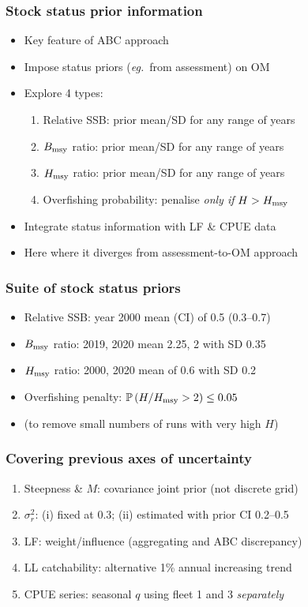 \documentclass{beamer}
\newcommand{\sigr}{\sigma^2_r}
\newcommand{\bmsy}{B_{\rm msy}}
\newcommand{\hmsy}{H_{\rm msy}}
\newcommand{\eg}{\textit{eg.}~}
\begin{document}
\begin{frame}
\frametitle{Stock status prior information}
\begin{itemize}
    \item Key feature of ABC approach
    \item Impose status priors (\eg from assessment) on OM
    \item Explore 4 types:
        \vspace{0.25cm}
        \begin{enumerate}
            \item Relative SSB: prior mean/SD for any range of years
            \item $\bmsy$ ratio: prior mean/SD for any range of years
            \item $\hmsy$ ratio: prior mean/SD for any range of years
            \item Overfishing probability: penalise \emph{only if} $H>\hmsy$
        \end{enumerate}
        \vspace{0.25cm}
    \item Integrate status information with LF \& CPUE data
    \item Here where it diverges from assessment-to-OM approach
\end{itemize}
\end{frame}
\begin{frame}
\frametitle{Suite of stock status priors}
\begin{itemize}
    \item Relative SSB: year 2000 mean (CI) of 0.5 (0.3--0.7)
    \item $\bmsy$ ratio: 2019, 2020 mean 2.25, 2 with SD 0.35
    \item $\hmsy$ ratio: 2000, 2020 mean of 0.6 with SD 0.2
    \item Overfishing penalty: $\mathbb{P}\left(H/\hmsy>2\right)\leq 0.05$ 
    \item (to remove small numbers of runs with very high $H$)
\end{itemize}
\end{frame}
\begin{frame}
\frametitle{Covering previous axes of uncertainty}
\begin{enumerate}
    \item Steepness \& $M$: covariance joint prior (not discrete grid)
    \item $\sigr$: (i) fixed at 0.3; (ii) estimated with prior CI 0.2--0.5  
    \item LF: weight/influence (aggregating and ABC discrepancy) 
    \item LL catchability: alternative 1\% annual increasing trend
    \item CPUE series: seasonal $q$ using fleet 1 and 3 \emph{separately}
\end{enumerate}
\end{frame}
\end{document}
